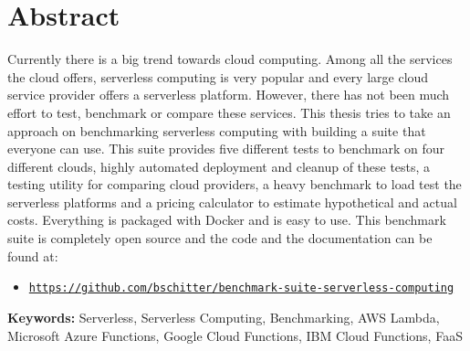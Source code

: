 \chapter*{Abstract}
Currently there is a big trend towards cloud computing. Among all the services the cloud offers, serverless computing is very popular and every large cloud service provider offers a serverless platform. However, there has not been much effort to test, benchmark or compare these services. This thesis tries to take an approach on benchmarking serverless computing with building a suite that everyone can use.
\newline
This suite provides five different tests to benchmark on four different clouds, highly automated deployment and cleanup of these tests, a testing utility for comparing cloud providers, a heavy benchmark to load test the serverless platforms and a pricing calculator to estimate hypothetical and actual costs. Everything is packaged with Docker and is easy to use.
\newline
This benchmark suite is completely open source and the code and the documentation can be found at:
\begin{itemize}
\item[] \texttt{\href{https://github.com/bschitter/benchmark-suite-serverless-computing}{https://github.com/bschitter/benchmark-suite-serverless-computing}}
\end{itemize}
\textbf{Keywords:} Serverless, Serverless Computing, Benchmarking, \gls{AWS} Lambda, Microsoft Azure Functions, Google Cloud Functions, \gls{IBM} Cloud Functions, \gls{FaaS}